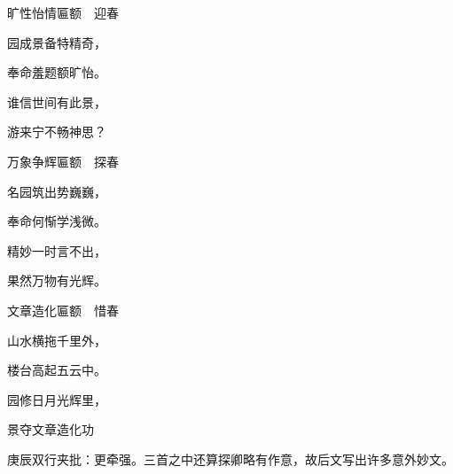 \begin{poem}
    \begin{pl}旷性怡情匾额　迎春 \end{pl}

    \begin{pl}园成景备特精奇， \end{pl}

    \begin{pl}奉命羞题额旷怡。 \end{pl}

    \begin{pl}谁信世间有此景， \end{pl}

    \begin{pl}游来宁不畅神思？ \end{pl}
\end{poem}
\begin{poem}
    \begin{pl}万象争辉匾额　探春 \end{pl}

    \begin{pl}名园筑出势巍巍， \end{pl}

    \begin{pl}奉命何惭学浅微。 \end{pl}

    \begin{pl}精妙一时言不出， \end{pl}

    \begin{pl}果然万物有光辉。 \end{pl}
\end{poem}
\begin{poem}
    \begin{pl}文章造化匾额　惜春 \end{pl}

    \begin{pl}山水横拖千里外， \end{pl}

    \begin{pl}楼台高起五云中。 \end{pl}

    \begin{pl}园修日月光辉里， \end{pl}

    \begin{pl}景夺文章造化功 \end{pl} \begin{note}庚辰双行夹批：更牵强。三首之中还算探卿略有作意，故后文写出许多意外妙文。\end{note}
\end{poem}
